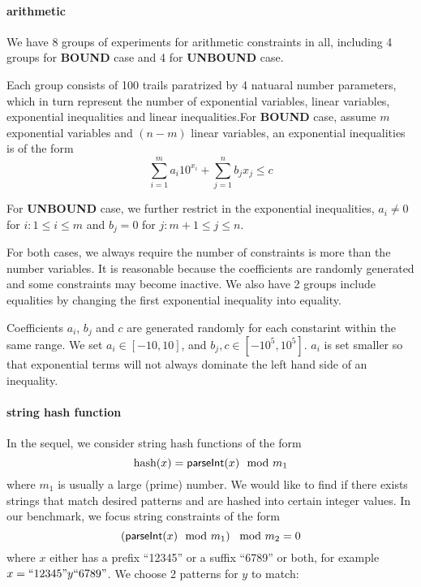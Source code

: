 \paragraph{arithmetic}

We have 8 groups of experiments for arithmetic constraints in all, including 4 groups for \textbf{BOUND} case and 4 for \textbf{UNBOUND} case.

Each group consists of 100 trails paratrized by 4 natuaral number parameters, which in turn represent the number of exponential variables, linear variables, exponential inequalities and linear inequalities.For \textbf{BOUND} case, assume $m$ exponential variables and $(n-m)$ linear variables, an exponential inequalities is of the form
$$\sum_{i=1}^m a_i 10^{x_i} + \sum_{j=1}^n b_j x_j \le c$$

For \textbf{UNBOUND} case, we further restrict in the exponential inequalities, $a_i\neq 0$ for $i:1\le i\le m$ and $b_j=0$ for $j:m+1\le j \le n$.

For both cases, we always require the number of constraints is more than the number variables. It is reasonable because the coefficients are randomly generated and some constraints may become inactive. We also have 2 groups include equalities by changing the first exponential inequality into equality.  

Coefficients $a_i$, $b_j$ and $c$ are generated randomly for each constarint within the same range. We set $a_i\in [-10,10]$, and $b_j,c\in[-10^5,10^5]$. $a_i$ is set smaller so that exponential terms will not always dominate the left hand side of an inequality.

\paragraph{string hash function}

In the sequel, we consider string hash functions of the form  
\begin{equation}
    \text{hash}(x)= \textsf{parseInt}(x) \mod m_1  \notag
\end{equation}
where $m_1$ is usually a large (prime) number. We would like to find if there exists strings that match desired patterns and are hashed into certain integer values. In our benchmark, we focus string constraints of the form
\begin{equation}
    \left( \textsf{parseInt}(x) \mod m_1\right) \mod m_2 = 0   \notag
\end{equation}
where $x$ either has a prefix ``12345'' or a suffix ``6789'' or both, for example $x=``12345"y``6789"$. We choose 2 patterns for $y$ to match: 

